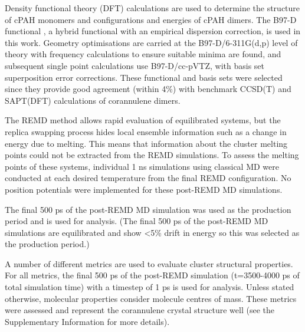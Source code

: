 Density functional theory (DFT) calculations are used to determine the structure of cPAH monomers and configurations and energies of cPAH dimers. The B97-D functional \cite{grimme2006semiempirical}, a hybrid functional with an empirical dispersion correction, is used in this work.  Geometry optimisations are carried at the B97-D/6-311G(d,p) level of theory with frequency calculations to ensure suitable minima are found, and subsequent single point calculations use B97-D/cc-pVTZ, with basis set superposition error corrections.  These functional and basis sets were selected since they provide good agreement (within 4\%) with benchmark CCSD(T) \cite{janowski2011convex} and SAPT(DFT) \cite{Cabaleiro-Lago2018} calculations of corannulene dimers. %

The REMD method allows rapid evaluation of equilibrated systems, but the replica swapping process hides local ensemble information such as a change in energy due to melting. This means that information about the cluster melting points could not be extracted from the REMD simulations. To assess the melting points of these systems, individual 1 ns simulations using classical MD were conducted at each desired temperature from the final REMD configuration. No position potentials were implemented for these post-REMD MD simulations.

The final 500 ps of the post-REMD MD simulation was used as the production period and is used for analysis.
(The final 500 ps of the post-REMD MD simulations are equilibrated and show <5\% drift in energy so this was selected as the production period.)

A number of different metrics are used to evaluate cluster structural properties. For all metrics, the final 500 ps of the post-REMD simulation (t=3500-4000 ps of total simulation time) with a timestep of 1 ps is used for analysis. Unless stated otherwise, molecular properties consider molecule centres of mass.
These metrics were assessed and represent the corannulene crystal structure well (see the Supplementary Information for more details).

